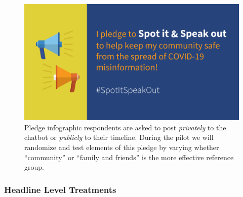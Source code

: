 \documentclass[letterpaper, 12pt, parskip=full,DIV=10]{scrartcl}
\begin{document}
\begin{enumerate}
\begin{figure}[htb]
\centering
\includegraphics[width=.5\textwidth]{figures/pledge_image.png}
\caption{Pledge infographic respondents are asked to post \textit{privately} to the chatbot or \textit{publicly} to their timeline. During the pilot we will randomize and test elements of this pledge by varying whether ``community'' or ``family and friends'' is the more effective reference group.}
\end{figure}
\end{enumerate}


\subsubsection{Headline Level Treatments}
\end{document}
